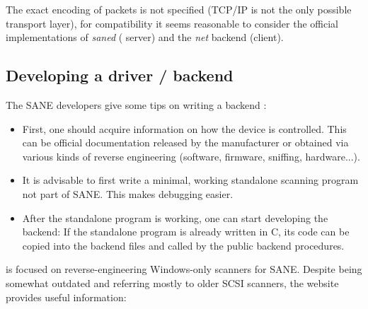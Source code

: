 \documentclass{article}
\begin{document}
The exact encoding of packets is not specified (TCP/IP is not the only possible
transport layer), for compatibility it seems reasonable to consider the official
implementations of {\it saned} ( server) and the {\it net} backend (client). \cite[5]{sane_standard}

\subsection{Developing a driver / backend}

The SANE developers give some tips on writing a backend \cite{sane_develop}:

\begin{itemize}
  \item First, one should acquire information on how the device is controlled. This
        can be official documentation released by the manufacturer or obtained via
        various kinds of reverse engineering (software, firmware, sniffing, hardware...).
  \item It is advisable to first write a minimal, working standalone scanning program not part of SANE.
        This makes debugging easier.
  \item After the standalone program is working, one can start developing the backend:
        If the standalone program is already written in C, its code can be copied
        into the backend files and called by the public backend procedures.
\end{itemize}

\cite{sane_develop_re} is focused on reverse-engineering
Windows-only scanners for SANE. Despite being somewhat outdated and referring mostly
to older SCSI scanners, the website provides useful information:
\end{document}

